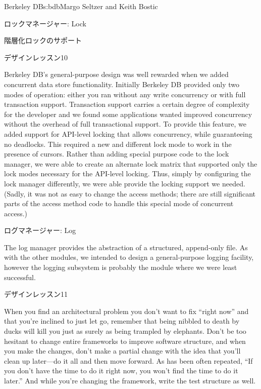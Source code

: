 \begin{aosachapter}{Berkeley DB}{s:bdb}{Margo Seltzer and Keith Bostic}
\begin{aosasect1}{ロックマネージャー: Lock}
\begin{aosasect2}{階層化ロックのサポート}
\begin{aosabox}{デザインレッスン10}

Berkeley DB's general-purpose design was well rewarded when we added
concurrent data store functionality. Initially Berkeley
DB provided only two modes of operation: either you ran without any
write concurrency or with full transaction support. Transaction
support carries a certain degree of complexity for the developer and
we found some applications wanted improved concurrency without the
overhead of full transactional support. To provide this feature, we
added support for API-level locking that allows concurrency, while
guaranteeing no deadlocks.  This required a new and different lock
mode to work in the presence of cursors. Rather than adding special
purpose code to the lock manager, we were able to create an alternate
lock matrix that supported only the lock modes necessary for the
API-level locking.  Thus, simply by configuring the lock manager
differently, we were able provide the locking support we
needed. (Sadly, it was not as easy to change the access methods; there
are still significant parts of the access method code to handle this
special mode of concurrent access.)

\end{aosabox}

\end{aosasect2}

\end{aosasect1}

\begin{aosasect1}{ログマネージャー: Log}
\label{sec.bdb.log}

The log manager provides the abstraction of a structured, append-only
file. As with the other modules, we intended to design a
general-purpose logging facility, however the logging subsystem is
probably the module where we were least successful. 

\begin{aosabox}{デザインレッスン11}

When you find an architectural problem you don't want to fix ``right
now'' and that you're inclined to just let go, remember that being
nibbled to death by ducks will kill you just as surely as being
trampled by elephants. Don't be too hesitant to change entire
frameworks to improve software structure, and when you make the
changes, don't make a partial change with the idea that you'll clean
up later---do it all and then move forward. As has been often
repeated, ``If you don't have the time to do it right now, you won't
find the time to do it later.'' And while you're changing the
framework, write the test structure as well.


\end{aosabox}
\end{aosasect1}
\end{aosachapter}
